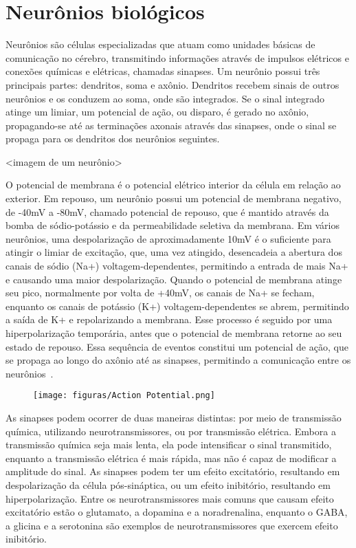 \section{Neurônios biológicos}

Neurônios são células especializadas que atuam como unidades básicas de comunicação no cérebro, transmitindo informações através
de impulsos elétricos e conexões químicas e elétricas, chamadas sinapses. Um neurônio possui três principais partes: dendritos,
soma e axônio. Dendritos recebem sinais de outros neurônios e os conduzem ao soma, onde são integrados. Se o sinal integrado
atinge um limiar, um potencial de ação, ou disparo, é gerado no axônio, propagando-se até as terminações axonais através das
sinapses, onde o sinal se propaga para os dendritos dos neurônios seguintes.

<imagem de um neurônio>

O potencial de membrana é o potencial elétrico interior da célula em relação ao exterior. Em repouso, um neurônio possui um
potencial de membrana negativo, de -40mV a -80mV, chamado potencial de repouso, que é mantido através da bomba de sódio-potássio e
da permeabilidade seletiva da membrana. Em vários neurônios, uma despolarização de aproximadamente 10mV é o suficiente para
atingir o limiar de excitação, que, uma vez atingido, desencadeia a abertura dos canais de sódio (Na+) voltagem-dependentes,
permitindo a entrada de mais Na+ e causando uma maior despolarização. Quando o potencial de membrana
atinge seu pico, normalmente por volta de +40mV, os canais de Na+ se fecham, enquanto os canais de potássio (K+)
voltagem-dependentes se abrem, permitindo a saída de K+ e repolarizando a membrana. Esse processo é seguido por uma
hiperpolarização temporária, antes que o potencial de membrana retorne ao seu estado de repouso. Essa sequência de eventos
constitui um potencial de ação, que se propaga ao longo do axônio até as sinapses, permitindo a comunicação entre os
neurônios~\cite{kandelPrinciples2021}.

\begin{figure}[!ht]
\centering
\label{action_potential}
\texttt{[image: figuras/Action Potential.png]}
\end{figure}


As sinapses podem ocorrer de duas maneiras distintas: por meio de transmissão química, utilizando neurotransmissores, ou por
transmissão elétrica. Embora a transmissão química seja mais lenta, ela pode intensificar o sinal transmitido, enquanto a
transmissão elétrica é mais rápida, mas não é capaz de modificar a amplitude do sinal. As sinapses podem ter um efeito
excitatório, resultando em despolarização da célula pós-sináptica, ou um efeito inibitório, resultando em hiperpolarização. Entre
os neurotransmissores mais comuns que causam efeito excitatório estão o glutamato, a dopamina e a noradrenalina, enquanto o GABA,
a glicina e a serotonina são exemplos de neurotransmissores que exercem efeito inibitório.

